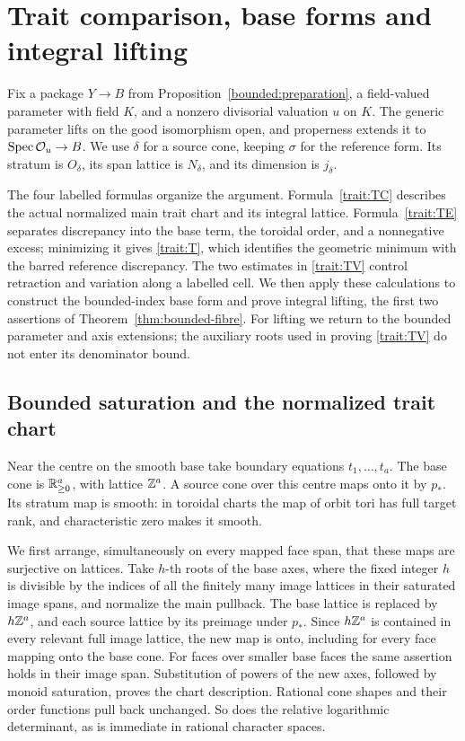 \section{Trait comparison, base forms and integral lifting}
\label{sec:traits}

Fix a package \(Y\to B\) from Proposition~\ref{bounded:preparation}, a
field-valued parameter with field \(K\), and a nonzero divisorial
valuation \(u\) on \(K\).  The generic parameter lifts on the good
isomorphism open, and properness extends it to
\(\operatorname{Spec}\mathcal O_u\to B\).  We use \(\delta\) for a source cone, keeping
\(\sigma\) for the reference form.  Its stratum is \(O_\delta\), its
span lattice is \(N_\delta\), and its dimension is \(j_\delta\).

The four labelled formulas organize the argument.
Formula~\eqref{trait:TC} describes the actual normalized main trait
chart and its integral lattice. Formula~\eqref{trait:TE} separates
discrepancy into the base term, the toroidal order, and a nonnegative
excess; minimizing it gives \eqref{trait:T}, which identifies the
geometric minimum with the barred reference discrepancy. The two estimates in
\eqref{trait:TV} control retraction and variation along a labelled
cell. We then apply these calculations to construct the bounded-index
base form and prove integral lifting, the first two assertions of
Theorem~\ref{thm:bounded-fibre}. For lifting we return to the bounded
parameter and axis extensions; the auxiliary roots used in proving
\eqref{trait:TV} do not enter its denominator bound.

\subsection{Bounded saturation and the normalized trait chart}

Near the centre on the smooth base take boundary equations
\(t_1,\ldots,t_a\).  The base cone is \(\mathbb R_{\ge0}^a\), with lattice
\(\mathbb Z^a\).  A source cone over this centre maps onto it by \(p_*\).
Its stratum map is smooth: in toroidal charts the map of orbit tori
has full target rank, and characteristic zero makes it smooth.

We first arrange, simultaneously on every mapped face span, that
these maps are surjective on lattices.  Take \(h\)-th roots of the
base axes, where the fixed integer \(h\) is divisible by the indices
of all the finitely many image lattices in their saturated image
spans, and normalize the main pullback.  The base lattice is replaced
by \(h\mathbb Z^a\), and each source lattice by its preimage under \(p_*\).
Since \(h\mathbb Z^a\) is contained in every relevant full image lattice,
the new map is onto, including for every face mapping onto the base
cone.  For faces over smaller base faces the same assertion holds in
their image span.  Substitution of powers of the new axes, followed
by monoid saturation, proves the chart description.  Rational cone
shapes and their order functions pull back unchanged.  So does the
relative logarithmic determinant, as is immediate in rational
character spaces.

